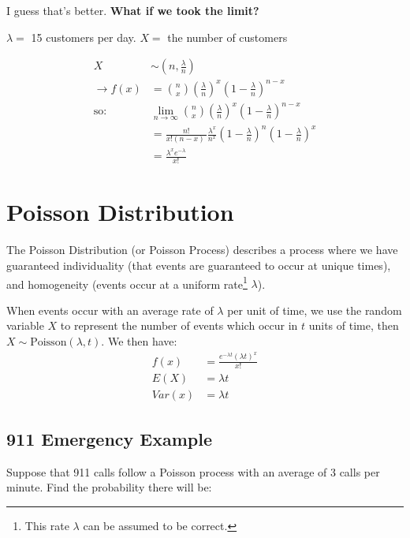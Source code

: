                     I guess that's better.
                    \textbf{What if we took the limit?}

                    $\lambda =$ 15 customers per day.
                    $X = $ the number of customers

                    \begin{align*}
                        X &\sim (n, \frac{\lambda}{n}) \\
                        \to f(x) &= {n \choose x} (\frac{\lambda}{n}) ^ x (1 - \frac{\lambda}{n})^{n - x} \\
                        \text{so: }& \lim_{n \to \infty}  {n \choose x} (\frac{\lambda}{n}) ^ x (1 - \frac{\lambda}{n})^{n - x} \\
                        &= \frac{n!}{x! (n-x)~} \frac{\lambda^x}{n^x} (1-\frac{\lambda}{n})^n(1 - \frac{\lambda}{n}) ^x \\
                        &= \frac{\lambda ^x e^ {-\lambda}}{x!}
                    \end{align*}

            \section{Poisson Distribution} %
            \label{sec:poisson_distribution}
                The Poisson Distribution (or Poisson Process) describes a process where we have guaranteed individuality (that events are guaranteed to occur at unique times), and homogeneity (events occur at a uniform rate\footnote{This rate $\lambda$ can be assumed to be correct.} $\lambda$).

                When events occur with an average rate of $\lambda$ per unit of time, we use the random variable $X$ to represent the number of events which occur in $t$ units of time, then $X \sim \text{Poisson}(\lambda, t)$.
                We then have:
                \begin{align*}
                    f(x) &= \frac{e^{-\lambda t} (\lambda t)^x}{x!} \\
                    E(X) &= \lambda t \\
                    Var(x) &= \lambda t
                \end{align*}
                \subsection{911 Emergency Example} %
                \label{sub:911_emergency_example}
                    Suppose that 911 calls follow a Poisson process with an average of 3 calls per minute. Find the probability there will be:


